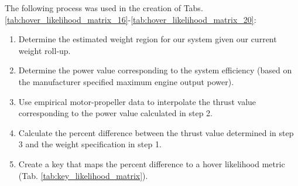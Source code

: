 \documentclass{article}
\begin{document}
The following process was used in the creation of Tabs. \ref{tab:hover_likelihood_matrix_16}-\ref{tab:hover_likelihood_matrix_20}:
\begin{enumerate}
    \item Determine the estimated weight region for our system given our current weight roll-up.
    \item Determine the power value corresponding to the system efficiency (based on the manufacturer specified maximum engine output power).
    \item Use empirical motor-propeller data to interpolate the thrust value corresponding to the power value calculated in step 2.
    \item Calculate the percent difference between the thrust value determined in step 3 and the weight specification in step 1.
    \item Create a key that maps the percent difference to a hover likelihood metric (Tab. \ref{tab:key_likelihood_matrix}).
\end{enumerate}
\end{document}
